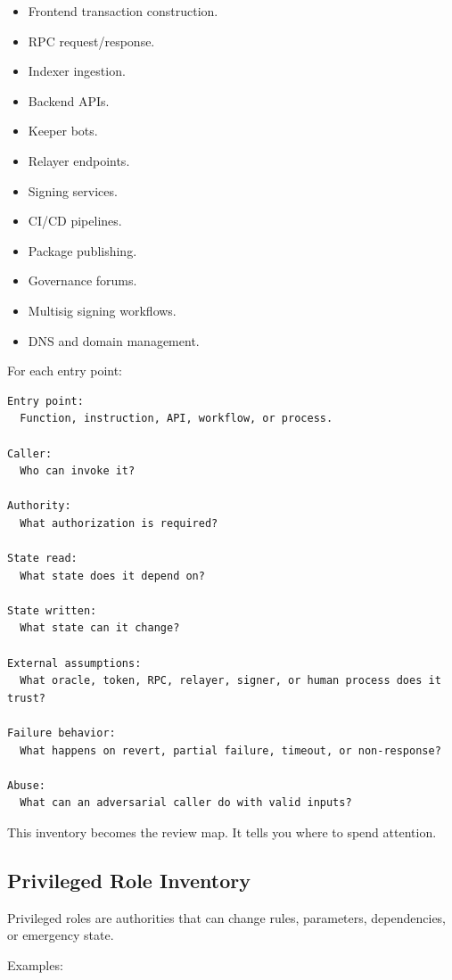 \begin{itemize}
\tightlist
\item
  Frontend transaction construction.
\item
  RPC request/response.
\item
  Indexer ingestion.
\item
  Backend APIs.
\item
  Keeper bots.
\item
  Relayer endpoints.
\item
  Signing services.
\item
  CI/CD pipelines.
\item
  Package publishing.
\item
  Governance forums.
\item
  Multisig signing workflows.
\item
  DNS and domain management.
\end{itemize}

For each entry point:

\begin{lstlisting}
Entry point:
  Function, instruction, API, workflow, or process.

Caller:
  Who can invoke it?

Authority:
  What authorization is required?

State read:
  What state does it depend on?

State written:
  What state can it change?

External assumptions:
  What oracle, token, RPC, relayer, signer, or human process does it trust?

Failure behavior:
  What happens on revert, partial failure, timeout, or non-response?

Abuse:
  What can an adversarial caller do with valid inputs?
\end{lstlisting}

This inventory becomes the review map. It tells you where to spend
attention.

\subsection{Privileged Role Inventory}

Privileged roles are authorities that can change rules, parameters,
dependencies, or emergency state.

Examples:

